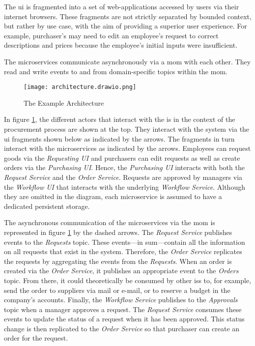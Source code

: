 The \gls{ui} is fragmented into a set of web-applications accessed by users via their internet browsers.
These fragments are not strictly separated by bounded context, but rather by use case, with the aim of providing a superior user experience.
For example, purchaser's may need to edit an employee's request to correct descriptions and prices because the employee's initial inputs were insufficient.

The microservices communicate asynchronously via a \gls{mom} with each other.
They read and write events to and from domain-specific topics within the \gls{mom}.

\begin{figure}[H]
  \centering
  \texttt{[image: architecture.drawio.png]}
  \caption{The Example Architecture}\label{fig:example-architecture}
\end{figure}

In figure \ref{fig:example-architecture}, the different actors that interact with the \gls{is} in the context of the procurement process are shown at the top.
They interact with the system via the \gls{ui} fragments shown below as indicated by the arrows.
The fragments in turn interact with the microservices as indicated by the arrows.
Employees can request goods via the \emph{Requesting UI} and purchasers can edit requests as well as create orders via the \emph{Purchasing UI}.
Hence, the \emph{Purchasing UI} interacts with both the \emph{Request Service} and the \emph{Order Service}.
Requests are approved by managers via the \emph{Workflow UI} that interacts with the underlying \emph{Workflow Service}.
Although they are omitted in the diagram, each microservice is assumed to have a dedicated persistent storage.

The asynchronous communication of the microservices via the \gls{mom} is represented in figure \ref{fig:example-architecture} by the dashed arrows.
The \emph{Request Service} publishes events to the \emph{Requests} topic.
These events---in sum---contain all the information on all requests that exist in the system.
Therefore, the \emph{Order Service} replicates the requests by aggregating the events from the \emph{Requests}.
When an order is created via the \emph{Order Service}, it publishes an appropriate event to the \emph{Orders} topic.
From there, it could theoretically be consumed by other \glspl{is} to, for example, send the order to suppliers via mail or e-mail, or to reserve a budget in the company's accounts.
Finally, the \emph{Workflow Service} publishes to the \emph{Approvals} topic when a manager approves a request.
The \emph{Request Service} consumes these events to update the status of a request when it has been approved.
This status change is then replicated to the \emph{Order Service} so that purchaser can create an order for the request.

